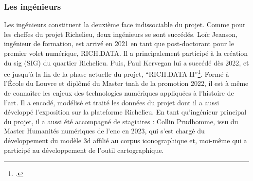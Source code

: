  
\subsubsection{Les ingénieurs}
 
Les ingénieurs constituent la deuxième face indissociable du projet. Comme pour les cheffes du projet Richelieu, deux ingénieurs se sont succédés. Loïc Jeanson, ingénieur de formation, est arrivé en 2021 en tant que post-doctorant pour le premier volet numérique, RICH.DATA. Il a principalement participé à la création du \acrlong{sig}  (SIG) du quartier Richelieu. Puis, Paul Kervegan lui a succédé dès 2022, et ce jusqu'à la fin de la phase actuelle du projet, \enquote{RICH.DATA II}\footcite{PROJETFondation2023}. Formé à l'École du Louvre et diplômé du Master \acrshort{tnah} de la promotion 2022, il est à même de connaître les enjeux des technologies numériques appliquées à l'histoire de l'art. Il a encodé, modélisé et traité les données du projet dont il a aussi développé l'exposition sur la plateforme Richelieu. En tant qu'ingénieur principal du projet, il a aussi été accompagné de stagiaires : Collin Prudhomme, issu du Master Humanités numériques de l'\acrshort{enc} en 2023, qui s'est chargé du développement du modèle \acrshort{3d} affilié au corpus iconographique et, moi-même qui a participé au développement de l'outil cartographique. 

